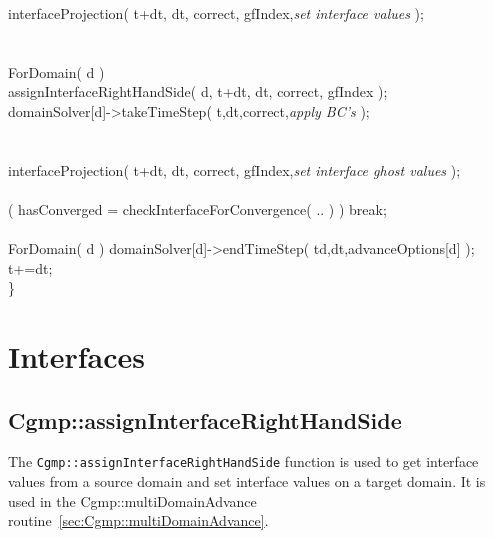\documentclass[11pt]{article}
\newcommand{\green}{\color{green}}
\begin{document}
\begin{flushleft}
\ic       interfaceProjection( t+dt, dt, correct, gfIndex,{\em\green set interface values} ); \\
\ic \\
\ic       {} \\
\ic       ForDomain( d )\\
\id        assignInterfaceRightHandSide( d, t+dt, dt, correct, gfIndex );  \\
\id        domainSolver[d]->takeTimeStep( t,dt,correct,{\em\green apply BC's} );  \\
\ic \\
\ic       {} \\
\ic       interfaceProjection( t+dt, dt, correct, gfIndex,{\em\green set interface ghost values} ); \\
\ic \\
\ic      \IF( hasConverged = checkInterfaceForConvergence( .. ) ) break; \\
\ib \\
\ib    ForDomain( d ) domainSolver[d]->endTimeStep( td,dt,advanceOptions[d] ); \\
\ib    t+=dt;  \\
\}
\end{flushleft}

\clearpage
\section{Interfaces }

\subsection{Cgmp::assignInterfaceRightHandSide} \label{sec:Cgmp::assignInterfaceRightHandSide}

The {\tt Cgmp::assignInterfaceRightHandSide} function is used to get interface values from a source
domain and set interface values on a target domain. It is used in the Cgmp::multiDomainAdvance routine~\ref{sec:Cgmp::multiDomainAdvance}.
\end{document}
